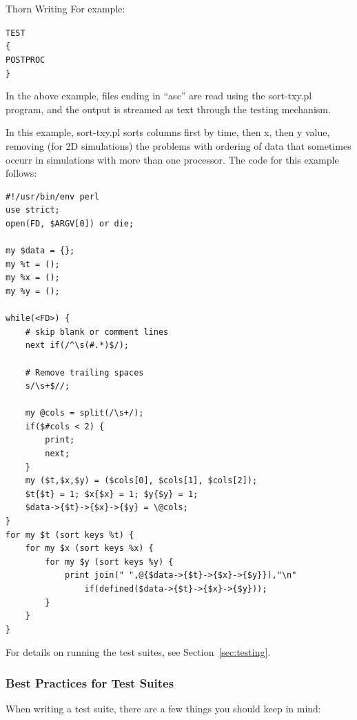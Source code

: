 \begin{cactuspart}{Thorn Writing}
For example:

\begin{alltt}
TEST 
\{
  POSTPROC  
\}
\end{alltt}

In the above example, files ending in ``asc'' are read using the sort-txy.pl
program, and the output is streamed as text through the testing mechanism.

In this example, sort-txy.pl sorts columns first by time, then x, then y
value, removing (for 2D simulations) the problems with ordering of data
that sometimes occurr in simulations with more than one processor. The code
for this example follows:
\begin{verbatim}
#!/usr/bin/env perl
use strict;
open(FD, $ARGV[0]) or die;

my $data = {};
my %t = ();
my %x = ();
my %y = ();

while(<FD>) {
    # skip blank or comment lines 
    next if(/^\s(#.*)$/);

    # Remove trailing spaces
    s/\s+$//;

    my @cols = split(/\s+/);
    if($#cols < 2) {
        print;
        next;
    }
    my ($t,$x,$y) = ($cols[0], $cols[1], $cols[2]);
    $t{$t} = 1; $x{$x} = 1; $y{$y} = 1;
    $data->{$t}->{$x}->{$y} = \@cols;
}
for my $t (sort keys %t) {
    for my $x (sort keys %x) {
        for my $y (sort keys %y) {
            print join(" ",@{$data->{$t}->{$x}->{$y}}),"\n"
                if(defined($data->{$t}->{$x}->{$y}));
        }
    }
}
\end{verbatim}

For details on running the test suites, see Section~\ref{sec:testing}.

\subsubsection{Best Practices for Test Suites}

When writing a test suite, there are a few things you should keep in
mind:


\end{cactuspart}
